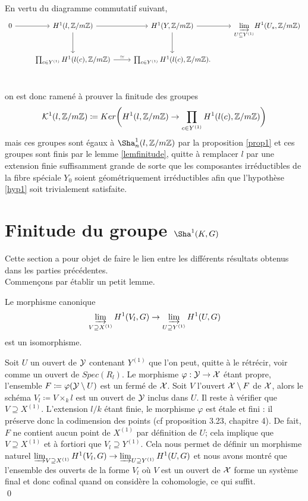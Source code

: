 \documentclass[11pt]{article}
\begin{document}
En vertu du diagramme commutatif suivant,
\[\begin{tikzcd}
  0 & H^1(l, \Z/m\Z) & H^1(Y, \Z/m\Z)  & \displaystyle{\drl_{U \subseteq Y^{(1)}}} H^1(U_s, \Z/m\Z) \\
  & \prod_{c \in Y^{(1)}} H^1(l(c), \Z /m\Z) &   \prod_{c \in Y^{(1)}} H^1(l(c), \Z /m\Z). \\
    \arrow[from=1-1, to=1-2]
    \arrow[from=1-2, to=1-3]
    \arrow[from=1-3, to=1-4]
    \arrow[from=1-2, to=2-2]
    \arrow[from=1-3, to=2-3]
    \arrow[from=2-2, to=2-3, "\simeq"]
\end{tikzcd}\]
on est donc ramené à prouver la finitude des groupes
$$
\CK^1(l, \Z / m\Z) \coloneqq Ker\bigg(H^1(l,\Z / m\Z) \ra \prod_{c \in Y^{(1)}} H^1(l(c), \Z /m\Z) \bigg)
$$
mais ces groupes sont égaux à $\Sha^1_n(l,\Z /m\Z)$ par la proposition \ref{prop1} et ces groupes sont finis par le lemme \ref{lemfinitude}, quitte à remplacer $l$ par une extension finie suffisamment grande de sorte que les composantes irréductibles de la fibre spéciale $Y_0$ soient géométriquement irréductibles afin que l'hypothèse \ref{hyp1}
soit trivialement satisfaite.\\


\section{Finitude du groupe $\Sha^1(K,G)$}\label{secfinitude}
Cette section a pour objet de faire le lien entre les différents résultats obtenus dans les parties précédentes. \\
Commençons par établir un petit lemme.
\begin{lemme}\label{lemcofinal}
Le morphisme canonique
$$
\varinjlim_{V \supseteq X^{(1)}} H^1(V_l,G) \rightarrow \varinjlim_{U \supseteq Y^{(1)}} H^1(U,G)
$$
est un isomorphisme.
\end{lemme}

\proof Soit $U$ un ouvert de $\mathcal{Y}$ contenant $Y^{(1)}$ que l'on peut, quitte à le rétrécir, voir comme un ouvert de $Spec(R_l)$. Le morphisme $\varphi : \mathcal{Y} \rightarrow \mathcal{X}$ étant propre, l'ensemble $F \coloneqq \varphi(\CY \setminus U)$ est un fermé de $\mathcal{X}$. Soit $V$ l'ouvert $\mathcal{X} \setminus F$ de $\mathcal{X}$, alors le schéma $V_l \coloneqq V \times_k l$ est un ouvert de $\mathcal{Y}$ inclus dans $U$. Il reste à vérifier que $V \supseteq X^{(1)}$. L'extension $l/k$ étant finie, le morphisme $\varphi$ est étale et fini : il préserve donc la codimension des points (cf \cite{Liu} proposition 3.23, chapitre 4). De fait, $F$ ne contient aucun point de $X^{(1)}$ par définition de $U$; cela implique que $V \supseteq X^{(1)}$ et à fortiori que $V_l \supseteq Y^{(1)}$. Cela nous permet de définir un morphisme naturel $\varinjlim_{V \supseteq X^{(1)}} H^1(V_l,G) \rightarrow \varinjlim_{U \supseteq Y^{(1)}} H^1(U,G)$
et nous avons montré que l'ensemble des ouverts de la forme $V_l$ où $V$ est un ouvert de $\mathcal{X}$ forme un système final et donc cofinal quand on considère la cohomologie, ce qui suffit.\\
\qed
\end{document}
